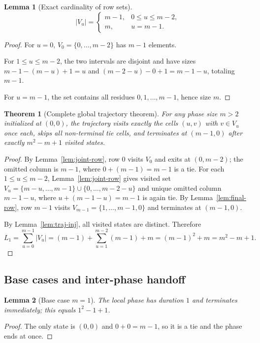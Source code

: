\documentclass[11pt]{article}
\newtheorem{theorem}{Theorem}
\newtheorem{lemma}{Lemma}
\theoremstyle{definition}
\theoremstyle{remark}
\begin{document}
\begin{lemma}[Exact cardinality of row sets]\label{lem:Vu-card}
\[
|V_u|=
\begin{cases}
m-1,& 0\le u\le m-2,\\
m,& u=m-1.
\end{cases}
\]
\end{lemma}
\begin{proof}
For $u=0$, $V_0=\{0,\dots,m-2\}$ has $m-1$ elements.

For $1\le u\le m-2$, the two intervals are disjoint and have sizes
$m-1-(m-u)+1=u$ and $(m-2-u)-0+1=m-1-u$, totaling $m-1$.

For $u=m-1$, the set contains all residues $0,1,\dots,m-1$, hence size $m$.
\end{proof}

\begin{theorem}[Complete global trajectory theorem]\label{thm:global-traj}
For any phase size $m>2$ initialized at $(0,0)$, the trajectory visits exactly the cells
$(u,v)$ with $v\in V_u$ once each, skips all non-terminal tie cells, and terminates at $(m-1,0)$ after
exactly $m^2-m+1$ visited states.
\end{theorem}
\begin{proof}
By Lemma~\ref{lem:joint-row}, row $0$ visits $V_0$ and exits at $(0,m-2)$; the omitted column is $m-1$, where
$0+(m-1)=m-1$ is a tie. For each $1\le u\le m-2$, Lemma~\ref{lem:joint-row} gives visited set
$V_u=\{m-u,\dots,m-1\}\cup\{0,\dots,m-2-u\}$ and unique omitted column $m-1-u$, where
$u+(m-1-u)=m-1$ is again tie. By Lemma~\ref{lem:final-row}, row $m-1$ visits
$V_{m-1}=\{1,\dots,m-1,0\}$ and terminates at $(m-1,0)$.

By Lemma~\ref{lem:traj-inj}, all visited states are distinct. Therefore
\[
L_1=\sum_{u=0}^{m-1}|V_u|
=(m-1)+\sum_{u=1}^{m-2}(m-1)+m
=(m-1)^2+m
=m^2-m+1.
\]
\end{proof}

\subsection{Base cases and inter-phase handoff}
\begin{lemma}[Base case $m=1$]\label{lem:base-m1}
The local phase has duration $1$ and terminates immediately; this equals $1^2-1+1$.
\end{lemma}
\begin{proof}
The only state is $(0,0)$ and $0+0=m-1$, so it is a tie and the phase ends at once.
\end{proof}
\end{document}
